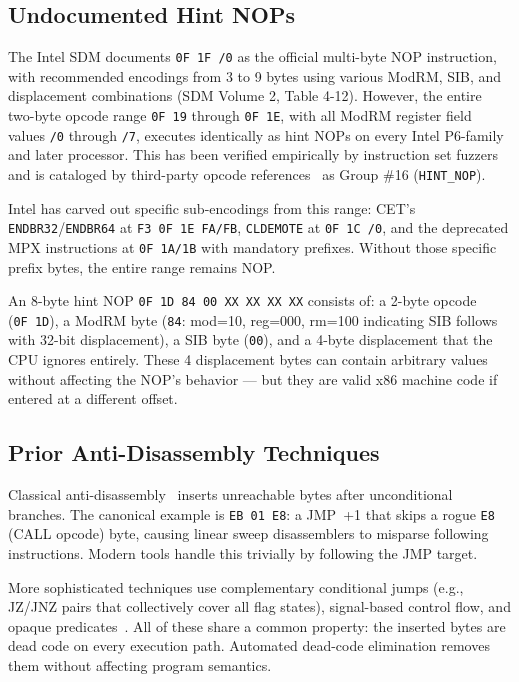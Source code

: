 \documentclass[letterpaper,twocolumn,10pt]{article}
\begin{document}
\subsection{Undocumented Hint NOPs}

The Intel SDM documents \texttt{0F~1F~/0} as the official multi-byte NOP instruction, with recommended encodings from 3 to 9 bytes using various ModRM, SIB, and displacement combinations (SDM Volume 2, Table 4-12). However, the entire two-byte opcode range \texttt{0F~19} through \texttt{0F~1E}, with all ModRM register field values \texttt{/0} through \texttt{/7}, executes identically as hint NOPs on every Intel P6-family and later processor. This has been verified empirically by instruction set fuzzers~\cite{sandsifter} and is cataloged by third-party opcode references~\cite{sandpile} as Group \#16 (\texttt{HINT\_NOP}).

Intel has carved out specific sub-encodings from this range: CET's \texttt{ENDBR32}/\texttt{ENDBR64} at \texttt{F3~0F~1E~FA/FB}, \texttt{CLDEMOTE} at \texttt{0F~1C~/0}, and the deprecated MPX instructions at \texttt{0F~1A/1B} with mandatory prefixes. Without those specific prefix bytes, the entire range remains NOP.

An 8-byte hint NOP \texttt{0F~1D~84~00~XX~XX~XX~XX} consists of: a 2-byte opcode (\texttt{0F~1D}), a ModRM byte (\texttt{84}: mod=10, reg=000, rm=100 indicating SIB follows with 32-bit displacement), a SIB byte (\texttt{00}), and a 4-byte displacement that the CPU ignores entirely. These 4 displacement bytes can contain arbitrary values without affecting the NOP's behavior --- but they are valid x86 machine code if entered at a different offset.

\subsection{Prior Anti-Disassembly Techniques}

Classical anti-disassembly~\cite{linn03} inserts unreachable bytes after unconditional branches. The canonical example is \texttt{EB~01~E8}: a JMP~+1 that skips a rogue \texttt{E8} (CALL opcode) byte, causing linear sweep disassemblers to misparse following instructions. Modern tools handle this trivially by following the JMP target.

More sophisticated techniques use complementary conditional jumps (e.g., JZ/JNZ pairs that collectively cover all flag states), signal-based control flow, and opaque predicates~\cite{collberg97}. All of these share a common property: the inserted bytes are dead code on every execution path. Automated dead-code elimination removes them without affecting program semantics.
\end{document}
